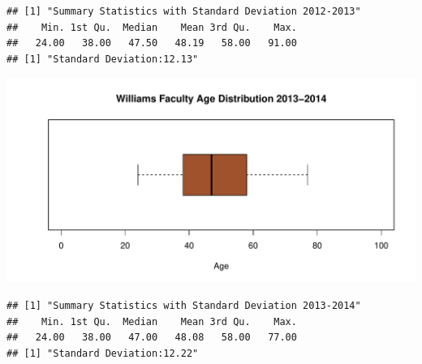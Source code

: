\documentclass[12pt,a4paper]{article}\usepackage[]{graphicx}\usepackage[]{color}
\makeatletter
\def\maxwidth{ %
  \ifdim\Gin@nat@width>\linewidth
    \linewidth
  \else
    \Gin@nat@width
  \fi
}
\newenvironment{kframe}{%
 \def\at@end@of@kframe{}%
 \ifinner\ifhmode%
  \def\at@end@of@kframe{\end{minipage}}%
  \begin{minipage}{\columnwidth}%
 \fi\fi%
 \def\FrameCommand##1{\hskip\@totalleftmargin \hskip-\fboxsep
 \colorbox{shadecolor}{##1}\hskip-\fboxsep
     \hskip-\linewidth \hskip-\@totalleftmargin \hskip\columnwidth}%
 \MakeFramed {\advance\hsize-\width
   \@totalleftmargin\z@ \linewidth\hsize
   \@setminipage}}%
 {\par\unskip\endMakeFramed%
 \at@end@of@kframe}
\newenvironment{knitrout}{}{} %
\theoremstyle{definition}
\makeatother
\begin{document}
\begin{knitrout}
\color{fgcolor}\begin{kframe}
\begin{verbatim}
## [1] "Summary Statistics with Standard Deviation 2012-2013"
##    Min. 1st Qu.  Median    Mean 3rd Qu.    Max. 
##   24.00   38.00   47.50   48.19   58.00   91.00
## [1] "Standard Deviation:12.13"
\end{verbatim}
\end{kframe}
\end{knitrout}

\begin{knitrout}
\color{fgcolor}
\includegraphics[width=\maxwidth]{figure/unnamed-chunk-32-1} 

\end{knitrout}

\begin{knitrout}
\color{fgcolor}\begin{kframe}
\begin{verbatim}
## [1] "Summary Statistics with Standard Deviation 2013-2014"
##    Min. 1st Qu.  Median    Mean 3rd Qu.    Max. 
##   24.00   38.00   47.00   48.08   58.00   77.00
## [1] "Standard Deviation:12.22"
\end{verbatim}
\end{kframe}
\end{knitrout}
\end{document}
